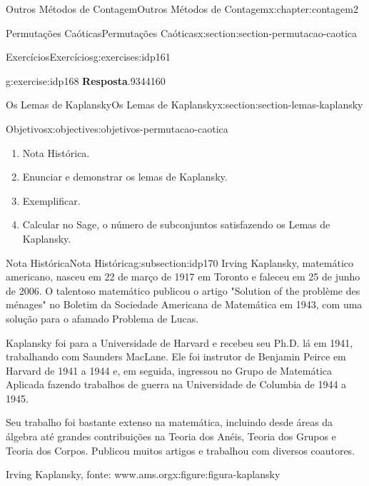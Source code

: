 \documentclass[oneside,10pt,]{book}
\newcommand{\blocktitlefont}{\relax}
\numberwithin{equation}{section}
\begin{document}
\begin{chapterptx}{Outros Métodos de Contagem}{}{Outros Métodos de Contagem}{}{}{x:chapter:contagem2}
\begin{sectionptx}{Permutações Caóticas}{}{Permutações Caóticas}{}{}{x:section:section-permutacao-caotica}
\begin{exercises-subsection}{Exercícios}{}{Exercícios}{}{}{g:exercises:idp161}
\begin{divisionexercise}{4}{}{}{g:exercise:idp168}
\noindent\textbf{\blocktitlefont Resposta}.\hypertarget{g:answer:idp169}{}\quad{}9344160%
\end{divisionexercise}%
\end{exercises-subsection}
\end{sectionptx}
%
%
\typeout{************************************************}
\typeout{************************************************}
%
\begin{sectionptx}{Os Lemas de Kaplansky}{}{Os Lemas de Kaplansky}{}{}{x:section:section-lemas-kaplansky}
\begin{objectives}{Objetivos}{x:objectives:objetivos-permutacao-caotica}
%
\begin{enumerate}
\item{}Nota Histórica.%
\item{}Enunciar e demonstrar os lemas de Kaplansky.%
\item{}Exemplificar.%
\item{}Calcular no Sage, o número de subconjuntos satisfazendo os Lemas de Kaplansky.%
\end{enumerate}
\end{objectives}
%
%
\typeout{************************************************}
\typeout{************************************************}
%
\begin{subsectionptx}{Nota Histórica}{}{Nota Histórica}{}{}{g:subsection:idp170}
Irving Kaplansky, matemático americano, nasceu em 22 de março de 1917 em Toronto e faleceu em 25 de junho de 2006. O talentoso matemático publicou o artigo "Solution of the problème des ménages"  no Boletim da Sociedade Americana de Matemática em 1943, com uma solução para o afamado Problema de Lucas.%
\par
Kaplansky foi para a Universidade de Harvard e recebeu seu Ph.D. lá em 1941, trabalhando com Saunders MacLane. Ele foi instrutor de Benjamin Peirce em Harvard de 1941 a 1944 e, em seguida, ingressou no Grupo de Matemática Aplicada fazendo trabalhos de guerra na Universidade de Columbia de 1944 a 1945.%
\par
Seu trabalho foi bastante extenso na matemática, incluindo desde áreas da álgebra até grandes contribuições na Teoria dos Anéis, Teoria dos Grupos e Teoria dos Corpos. Publicou muitos artigos e trabalhou com diversos coautores.%
\begin{figureptx}{Irving Kaplansky, fonte: www.ams.org}{x:figure:figura-kaplansky}{}%
\begin{image}{0.35}{0.3}{0.35}%

\end{image}
\end{figureptx}
\end{subsectionptx}
\end{sectionptx}
\end{chapterptx}
\end{document}
